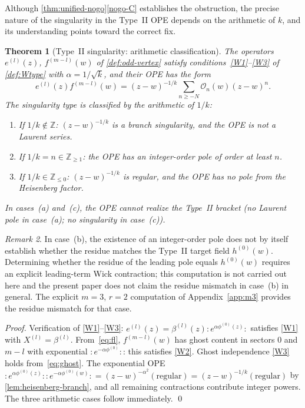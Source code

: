 \documentclass[12pt]{article}
\theoremstyle{plain}
\newtheorem{theorem}{Theorem}[section]
\theoremstyle{definition}
\theoremstyle{remark}
\newtheorem{remark}[theorem]{Remark}
\newcommand{\Z}{\mathbb{Z}}
\newcommand{\bl}[1]{\beta^{(#1)}}
\newcommand{\el}[1]{e^{(#1)}}
\newcommand{\hl}[1]{h^{(#1)}}
\newcommand{\fl}[1]{f^{(#1)}}
\newcommand{\no}[1]{:\!#1\!:}
\begin{document}
Although \cref{thm:unified-nogo}\ref{nogo-C} establishes the obstruction, the
precise nature of the singularity in the Type~II OPE depends on the arithmetic
of $k$, and its understanding points toward the correct fix.

\begin{theorem}[Type~II singularity: arithmetic classification]
\label{thm:obstruction}
  The operators $\el{l}(z)$, $\fl{m-l}(w)$ of \cref{def:odd-vertex} satisfy
  conditions~\ref{W1}--\ref{W3} of \cref{def:Wtype} with $\alpha=1/\sqrt{k}$,
  and their OPE has the form
  \[
    \el{l}(z)\fl{m-l}(w)
    = (z-w)^{-1/k}\sum_{n\geq -N}\mathcal{O}_n(w)(z-w)^n.
  \]
  The singularity type is classified by the arithmetic of $1/k$:
  \begin{enumerate}[label=\textup{(\alph*)}]
    \item If $1/k\notin\Z$: $(z-w)^{-1/k}$ is a branch singularity,
      and the OPE is not a Laurent series.
    \item If $1/k=n\in\Z_{\geq 1}$: the OPE has an integer-order pole of order
      at least $n$.
    \item If $1/k\in\Z_{\leq 0}$: $(z-w)^{-1/k}$ is regular, and the OPE has
      no pole from the Heisenberg factor.
  \end{enumerate}
  In cases~(a) and~(c), the OPE cannot realize the Type~II bracket
  (no Laurent pole in case~(a); no singularity in case~(c)).
\end{theorem}

\begin{remark}
  In case~(b), the existence of an integer-order pole does not by itself
  establish whether the residue matches the Type~II target field
  $\hl{0}(w)$.  Determining whether the residue of the leading pole equals
  $\hl{0}(w)$ requires an explicit leading-term Wick contraction; this
  computation is not carried out here and the present paper does not claim
  the residue mismatch in case~(b) in general.
  The explicit $m=3$, $r=2$ computation of Appendix~\ref{app:m3} provides
  the residue mismatch for that case.
\end{remark}

\begin{proof}
  Verification of \ref{W1}--\ref{W3}: $\el{l}(z)=\bl{l}(z)\no{e^{\alpha\phi^{(0)}(z)}}$
  satisfies \ref{W1} with $X^{(l)}=\bl{l}$.
  From~\eqref{eq:fl}, $\fl{m-l}(w)$ has ghost content in sectors $0$ and $m-l$
  with exponential $\no{e^{-\alpha\phi^{(0)}}}$: this satisfies \ref{W2}.
  Ghost independence \ref{W3} holds from~\eqref{eq:ghost}.
  The exponential OPE $\no{e^{\alpha\phi^{(0)}(z)}}\no{e^{-\alpha\phi^{(0)}(w)}}
  =(z-w)^{-\alpha^2}(\text{regular})=(z-w)^{-1/k}(\text{regular})$ by
  \cref{lem:heisenberg-branch}, and all remaining contractions contribute
  integer powers.  The three arithmetic cases follow immediately. \qed
\end{proof}
\end{document}
